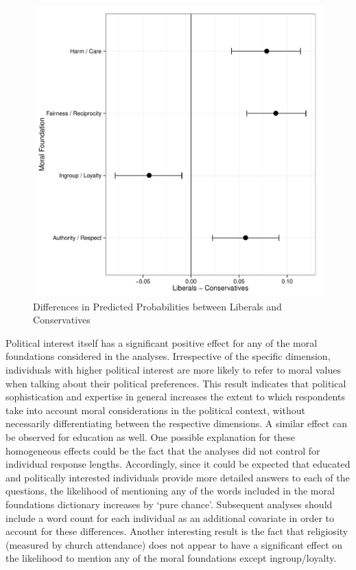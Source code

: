 \documentclass[12pt]{paper}
\begin{document}
\begin{figure}\centering
\includegraphics[scale=.55]{../calc/fig/p4_models.pdf}
\caption{Differences in Predicted Probabilities between Liberals and Conservatives}\label{fig:models}
\end{figure}

Political interest itself has a significant positive effect for any of the moral foundations considered in the analyses. Irrespective of the specific dimension, individuals with higher political interest are more likely to refer to moral values when talking about their political preferences. This result indicates that political sophistication and expertise in general increases the extent to which respondents take into account moral considerations in the political context, without necessarily differentiating between the respective dimensions. A similar effect can be observed for education as well. One possible explanation for these homogeneous effects could be the fact that the analyses did not control for individual response lengths. Accordingly, since it could be expected that educated and politically interested individuals provide more detailed answers to each of the questions, the likelihood of mentioning any of the words included in the moral foundations dictionary increases by `pure chance'. Subsequent analyses should include a word count for each individual as an additional covariate in order to account for these differences. Another interesting result is the fact that religiosity (measured by church attendance) does not appear to have a significant effect on the likelihood to mention any of the moral foundations except ingroup/loyalty.
\end{document}
